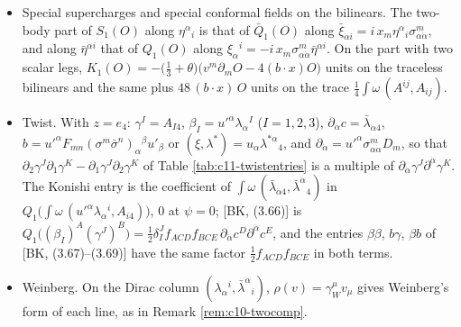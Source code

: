 \begin{remark}
\begin{itemize}
\item Special supercharges and special conformal fields on the bilinears. The two-body part of $S_1(O)$ along $\eta^\alpha{}_i$ is that of $\bar Q_1(O)$ along $\bar\xi_{\dot\alpha i}=i\,x_m\eta^\alpha{}_i\sigma^m_{\alpha\dot\alpha}$, and along $\bar\eta^{\dot\alpha i}$ that of $Q_1(O)$ along $\xi_\alpha{}^i=-i\,x_m\sigma^m_{\alpha\dot\alpha}\bar\eta^{\dot\alpha i}$. On the part with two scalar legs, $K_1(O)=-\big(\tfrac13+\theta\big)\big(v^m\partial_mO-4(b\cdot x)O\big)$ units on the traceless bilinears and the same plus $48\,(b\cdot x)\,O$ units on the trace $\tfrac14\int\omega\,(A^{ij},A_{ij})$.
\item Twist. With $z=e_4$: $\gamma^I=A_{I4}$, $\beta_I=u'^\alpha\lambda_\alpha{}^I$ ($I=1,2,3$), $\partial_{\dot\alpha}c=\bar\lambda_{\dot\alpha4}$, $b=u'^\alpha F_{mn}(\sigma^m\bar\sigma^n)_\alpha{}^\beta u'_\beta$ or $(\xi,\lambda^*)=u_\alpha\lambda^{*\alpha}{}_4$, and $\partial_{\dot\alpha}=u'^\alpha\sigma^m_{\alpha\dot\alpha}D_m$, so that $\partial_2\gamma^J\partial_1\gamma^K-\partial_1\gamma^J\partial_2\gamma^K$ of Table \ref{tab:c11-twistentries} is a multiple of $\partial_{\dot\alpha}\gamma^J\partial^{\dot\alpha}\gamma^K$. The Konishi entry is the coefficient of $\int\omega\,(\bar\lambda_{\dot\alpha4},\bar\lambda^{\dot\alpha}{}_4)$ in $Q_1\big(\int\omega\,(u'^\alpha\lambda_\alpha{}^i,A_{i4})\big)$, $0$ at $\psi=0$; [BK, (3.66)] is $Q_1\big((\beta_I)^A(\gamma^J)^B\big)=\tfrac12\delta^J_If_{ACD}f_{BCE}\,\partial_{\dot\alpha}c^D\partial^{\dot\alpha}c^E$, and the entries $\beta\beta$, $b\gamma$, $\beta b$ of [BK, (3.67)--(3.69)] have the same factor $\tfrac12f_{ACD}f_{BCE}$ in both terms.
\item Weinberg. On the Dirac column $(\lambda_\alpha{}^i,\bar\lambda^{\dot\alpha}{}_i)$, $\rho(v)=\gamma_W^\mu v_\mu$ gives Weinberg's form of each line, as in Remark \ref{rem:c10-twocomp}.
\end{itemize}
\end{remark}
